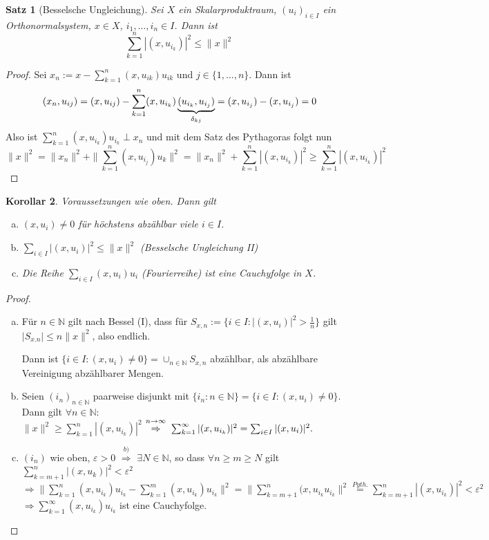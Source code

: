 \documentclass[ngerman]{report}
\theoremstyle{plain}%
\newtheorem{thm}{Satz}[chapter]
\newtheorem{cor}[thm]{Korollar}
\theoremstyle{definition}%
\theoremstyle{myStyle}
\newcommand{\N}{\mathbb{N}}
\newcommand{\norm}[1]{\|#1\|}
\newcommand{\df}[1][]{%
	\overset{#1}{\Rightarrow}
}
\newcommand{\disp}{\displaystyle}
\newcommand{\ff}[3]{(#1_#2)_{#2\in#3}}
\newcommand{\spcm}[1][-0.8]{\vspace{#1 em}}
\begin{document}
	\begin{thm}[Besselsche Ungleichung]
		Sei $X$ ein Skalarproduktraum, $\ff{u}{i}{I}$ ein Orthonormalsystem, $x\in X$, $i_1,\dots,i_n \in I$. Dann ist 
			$$\sum_{k=1}^n |(x,u_{i_k})|^2 \leq\norm{x}^2 $$
	\end{thm}
	\begin{proof}
		Sei $\disp x_n := x - \sum_{k=1}^n (x,u_{ik}) u_{ik}$ und $j\in \{1,\dots,n\}$. Dann ist
		\spcm[-1]
		$$(x_n, u_{ij}) = (x,u_{ij}) - \sum^n_{k=1} (x,u_{i_k}) \underbrace{(u_{i_k},u_{i_j})}_{\delta_{kj}}
		= (x, u_{i_j}) - (x, u_{i_j}) = 0 \spcm$$
		Also ist $\sum^n_{k=1} (x, u_{i_k}) u_{i_k} \perp x_n$
		und mit dem Satz des Pythagoras folgt nun
		\spcm[-0.5]
		$$\norm{x}^2 = \norm{x_n}^2+\|\sum^n_{k=1} (x,u_{i_j})u_k\|^2 = \|x_n\|^2 + \sum^n_{k=1}|(x,u_{i_k})|^2 \geq \sum^n_{k=1} |(x,u_{i_k})|^2$$
	\end{proof}
	
	\begin{cor}
		Voraussetzungen wie oben. Dann gilt\par
		\begin{enumerate}[(a)]
			\item $(x, u_i) \neq 0$ für höchstens abzählbar viele $i\in I$.
			\item $\sum_{i\in I} |(x, u_i)|^2 \leq \norm{x}^2$ (Besselsche Ungleichung II)
			\item Die Reihe $\sum_{i\in I} (x,u_i)u_i$ (Fourierreihe) ist eine Cauchyfolge in $X$.
		\end{enumerate}
	\end{cor}

	\begin{proof}
		\begin{enumerate}[(a)]
			\item Für $n\in\N$ gilt nach Bessel (I), dass für $S_{x,n} := \{ i\in I: |(x, u_i)| ^2 > \frac{1}{n} \}$ 
			gilt $|S_{x.n}| \leq n \norm{x}^2$, also endlich. \par
			Dann ist $\{i \in I: (x,u_i) \neq 0\} = \cup_{n\in\N} S_{x,n}$ abzählbar, als abzählbare Vereinigung abzählbarer Mengen.
			\item Seien $\ff{i}{n}{\N}$ paarweise disjunkt mit $\{i_n : n\in \N\} = \{i\in I: (x,u_i) \neq 0\}$.
			Dann gilt $\forall n\in \N:$\\
			$\norm{x}^2 \geq \sum_{k=1}^n |(x,u_{i_k})|^2$
			$\overset{n\to \infty}{\df}\; \sum_{k=1}^\infty |(x,u_{i_k})|^2 = \sum_{i\in I} |(x,u_i)|^2.$
			\item $(i_n)$ wie oben, $\varepsilon > 0$ 
			$\df[b)]$ $\exists N\in\N$, so dass $\forall n\geq m \geq N$ gilt 
			$\sum_{k = m+1}^n |(x,u_k)|^2 < \varepsilon^2$\\
			$\df \norm{\sum^n_{k=1} (x,u_{i_k})u_{i_k} - \sum^m_{k=1} (x,u_{i_k}) u_{i_k}}^2
			= \norm{ \sum_{k= m+1} ^ n (x, u_{i_k} u_{i_k}}^2 \overset{Pyth.}{=} \sum_{k=m+1}^n |(x,u_{i_k})|^2 < \varepsilon^2$\\
			$\df \sum^\infty_{k=1} (x,u_{i_k})u_{i_k} $ ist eine Cauchyfolge.
		\end{enumerate}
	\end{proof}
\end{document}

